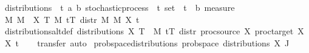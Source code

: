 \begin{isabellebody}
{\ distributions\ {\isacharcolon}{\kern0pt}{\isacharcolon}{\kern0pt}\ {\isachardoublequoteopen}{\isacharparenleft}{\kern0pt}{\isacharprime}{\kern0pt}t{\isacharcomma}{\kern0pt}\ {\isacharprime}{\kern0pt}a{\isacharcomma}{\kern0pt}\ {\isacharprime}{\kern0pt}b{\isacharparenright}{\kern0pt}\ stochastic{\isacharunderscore}{\kern0pt}process\ {\isasymRightarrow}\ {\isacharprime}{\kern0pt}t\ set\ {\isasymRightarrow}\ {\isacharparenleft}{\kern0pt}{\isacharprime}{\kern0pt}t\ {\isasymRightarrow}\ {\isacharprime}{\kern0pt}b{\isacharparenright}{\kern0pt}\ measure{\isachardoublequoteclose}\isanewline
{}\ {\isachardoublequoteopen}{\isasymlambda}{\isacharparenleft}{\kern0pt}M{\isacharcomma}{\kern0pt}\ M{\isacharprime}{\kern0pt}{\isacharcomma}{\kern0pt}\ {\isacharunderscore}{\kern0pt}{\isacharcomma}{\kern0pt}\ X{\isacharparenright}{\kern0pt}\ T{\isachardot}{\kern0pt}\ {\isacharparenleft}{\kern0pt}{\isasymPi}\isactrlsub M\ t{\isasymin}T{\isachardot}{\kern0pt}\ distr\ M\ M{\isacharprime}{\kern0pt}\ {\isacharparenleft}{\kern0pt}X\ t{\isacharparenright}{\kern0pt}{\isacharparenright}{\kern0pt}{\isachardoublequoteclose}%
}%
%
\isadelimproof
\ %
\endisadelimproof
%
\isatagproof
\isacommand{{\isachardot}{\kern0pt}}\isamarkupfalse%
%
\endisatagproof
{\isafoldproof}%
%
\isadelimproof
%
\endisadelimproof
\isanewline
\isanewline
{}\isamarkupfalse%
\ distributions{\isacharunderscore}{\kern0pt}altdef{\isacharcolon}{\kern0pt}\ {\isachardoublequoteopen}distributions\ X\ T\ {\isacharequal}{\kern0pt}\ {\isacharparenleft}{\kern0pt}{\isasymPi}\isactrlsub M\ t{\isasymin}T{\isachardot}{\kern0pt}\ distr\ {\isacharparenleft}{\kern0pt}proc{\isacharunderscore}{\kern0pt}source\ X{\isacharparenright}{\kern0pt}\ {\isacharparenleft}{\kern0pt}proc{\isacharunderscore}{\kern0pt}target\ X{\isacharparenright}{\kern0pt}\ {\isacharparenleft}{\kern0pt}X\ t{\isacharparenright}{\kern0pt}{\isacharparenright}{\kern0pt}{\isachardoublequoteclose}\isanewline
%
\isadelimproof
\ \ %
\endisadelimproof
%
\isatagproof
{}\isamarkupfalse%
\ {\isacharparenleft}{\kern0pt}transfer{\isacharcomma}{\kern0pt}\ auto{\isacharparenright}{\kern0pt}%
\endisatagproof
{\isafoldproof}%
%
\isadelimproof
\isanewline
%
\endisadelimproof
\isanewline
{}\isamarkupfalse%
\ prob{\isacharunderscore}{\kern0pt}space{\isacharunderscore}{\kern0pt}distributions{\isacharcolon}{\kern0pt}\ {\isachardoublequoteopen}prob{\isacharunderscore}{\kern0pt}space\ {\isacharparenleft}{\kern0pt}distributions\ X\ J{\isacharparenright}{\kern0pt}{\isachardoublequoteclose}\isanewline
%
\isadelimproof
\ \ %

\end{isabellebody}
